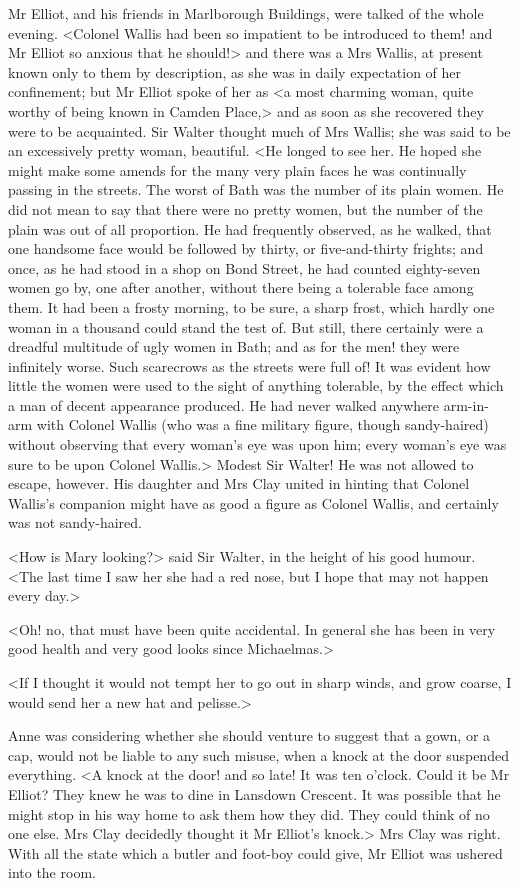 Mr Elliot, and his friends in Marlborough Buildings, were talked of the whole evening. <Colonel Wallis had been so impatient to be introduced to them! and Mr Elliot so anxious that he should!> and there was a Mrs Wallis, at present known only to them by description, as she was in daily expectation of her confinement; but Mr Elliot spoke of her as <a most charming woman, quite worthy of being known in Camden Place,> and as soon as she recovered they were to be acquainted. Sir Walter thought much of Mrs Wallis; she was said to be an excessively pretty woman, beautiful. <He longed to see her. He hoped she might make some amends for the many very plain faces he was continually passing in the streets. The worst of Bath was the number of its plain women. He did not mean to say that there were no pretty women, but the number of the plain was out of all proportion. He had frequently observed, as he walked, that one handsome face would be followed by thirty, or five-and-thirty frights; and once, as he had stood in a shop on Bond Street, he had counted eighty-seven women go by, one after another, without there being a tolerable face among them. It had been a frosty morning, to be sure, a sharp frost, which hardly one woman in a thousand could stand the test of. But still, there certainly were a dreadful multitude of ugly women in Bath; and as for the men! they were infinitely worse. Such scarecrows as the streets were full of! It was evident how little the women were used to the sight of anything tolerable, by the effect which a man of decent appearance produced. He had never walked anywhere arm-in-arm with Colonel Wallis (who was a fine military figure, though sandy-haired) without observing that every woman's eye was upon him; every woman's eye was sure to be upon Colonel Wallis.> Modest Sir Walter! He was not allowed to escape, however. His daughter and Mrs Clay united in hinting that Colonel Wallis's companion might have as good a figure as Colonel Wallis, and certainly was not sandy-haired.

<How is Mary looking?> said Sir Walter, in the height of his good humour. <The last time I saw her she had a red nose, but I hope that may not happen every day.>

<Oh! no, that must have been quite accidental. In general she has been in very good health and very good looks since Michaelmas.>

<If I thought it would not tempt her to go out in sharp winds, and grow coarse, I would send her a new hat and pelisse.>

Anne was considering whether she should venture to suggest that a gown, or a cap, would not be liable to any such misuse, when a knock at the door suspended everything. <A knock at the door! and so late! It was ten o'clock. Could it be Mr Elliot? They knew he was to dine in Lansdown Crescent. It was possible that he might stop in his way home to ask them how they did. They could think of no one else. Mrs Clay decidedly thought it Mr Elliot's knock.> Mrs Clay was right. With all the state which a butler and foot-boy could give, Mr Elliot was ushered into the room.

